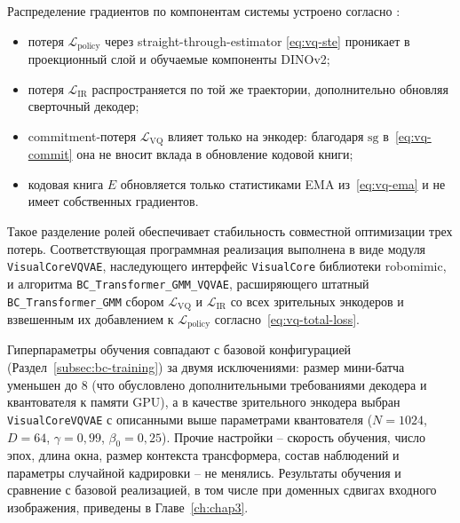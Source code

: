 Распределение градиентов по компонентам системы устроено согласно \cite{vandeoord2017neural,porichis2024imitation}:
\begin{itemize}
    \item потеря $\mathcal{L}_{\text{policy}}$ через straight-through-estimator \eqref{eq:vq-ste} проникает в проекционный слой и обучаемые компоненты DINOv2;
    \item потеря $\mathcal{L}_{\text{IR}}$ распространяется по той же траектории, дополнительно обновляя сверточный декодер;
    \item commitment-потеря $\mathcal{L}_{\text{VQ}}$ влияет только на энкодер: благодаря $\mathrm{sg}$ в~\eqref{eq:vq-commit} она не вносит вклада в обновление кодовой книги;
    \item кодовая книга $E$ обновляется только статистиками EMA из~\eqref{eq:vq-ema} и не имеет собственных градиентов.
\end{itemize}
Такое разделение ролей обеспечивает стабильность совместной оптимизации трех потерь. Соответствующая программная реализация выполнена в виде модуля \texttt{VisualCoreVQVAE}, наследующего интерфейс \texttt{VisualCore} библиотеки robomimic, и алгоритма \texttt{BC\_Transformer\_GMM\_VQVAE}, расширяющего штатный \texttt{BC\_Transformer\_GMM} сбором $\mathcal{L}_{\text{VQ}}$ и $\mathcal{L}_{\text{IR}}$ со всех зрительных энкодеров и взвешенным их добавлением к $\mathcal{L}_{\text{policy}}$ согласно~\eqref{eq:vq-total-loss}.

Гиперпараметры обучения совпадают с базовой конфигурацией (Раздел~\ref{subsec:bc-training}) за двумя исключениями: размер мини-батча уменьшен до 8 (что обусловлено дополнительными требованиями декодера и квантователя к памяти GPU), а в качестве зрительного энкодера выбран \texttt{VisualCoreVQVAE} с описанными выше параметрами квантователя ($N = 1024$, $D = 64$, $\gamma = 0{,}99$, $\beta_0 = 0{,}25$). Прочие настройки -- скорость обучения, число эпох, длина окна, размер контекста трансформера, состав наблюдений и параметры случайной кадрировки -- не менялись. Результаты обучения и сравнение с базовой реализацией, в том числе при доменных сдвигах входного изображения, приведены в Главе~\ref{ch:chap3}.

\endinput
